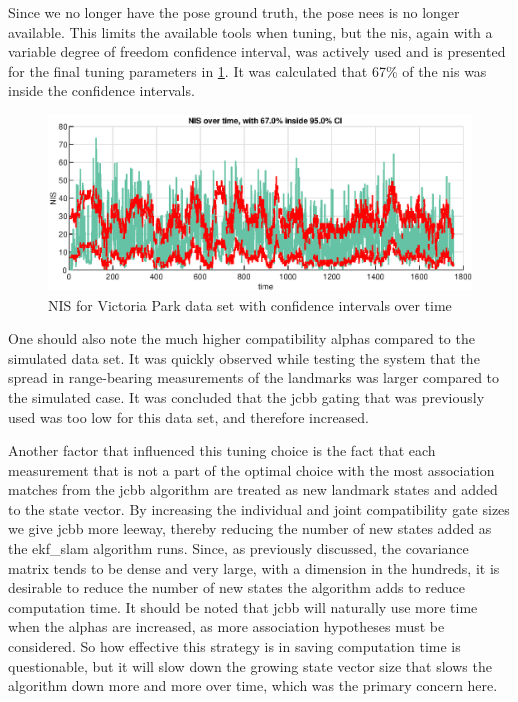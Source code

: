 Since we no longer have the pose ground truth, the pose \acrshort{nees} is no longer available. This limits the available tools when tuning, but the \acrshort{nis}, again with a variable degree of freedom confidence interval, was actively used and is presented for the final tuning parameters in \cref{fig:ga_3_real_NIS}. It was calculated that 67\% of the \acrshort{nis} was inside the confidence intervals.  

\begin{figure}[!htb]
    \centering
    \includegraphics[width=0.7\linewidth]{figures/ga_3/real_NIS.eps}
    \caption{NIS for Victoria Park data set with confidence intervals over time}
    \label{fig:ga_3_real_NIS}
\end{figure}

One should also note the much higher compatibility alphas compared to the simulated data set. It was quickly observed while testing the system that the spread in range-bearing measurements of the landmarks was larger compared to the simulated case. It was concluded that the \acrshort{jcbb} gating that was previously used was too low for this data set, and therefore increased.

Another factor that influenced this tuning choice is the fact that each measurement that is not a part of the optimal choice with the most association matches from the \acrshort{jcbb} algorithm are treated as new landmark states and added to the state vector. By increasing the individual and joint compatibility gate sizes we give \acrshort{jcbb} more leeway, thereby reducing the number of new states added as the \acrshort{ekf_slam} algorithm runs. Since, as previously discussed, the covariance matrix tends to be dense and very large, with a dimension in the hundreds, it is desirable to reduce the number of new states the algorithm adds to reduce computation time. It should be noted that \acrshort{jcbb} will naturally use more time when the alphas are increased, as more association hypotheses must be considered. So how effective this strategy is in saving computation time is questionable, but it will slow down the growing state vector size that slows the algorithm down more and more over time, which was the primary concern here. 

